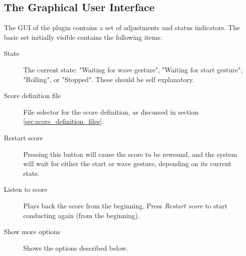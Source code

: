 \documentclass[12pt,a4paper]{article}
\begin{document}
\subsection{The Graphical User Interface}

The GUI of the plugin contains a set of adjustments and status indicators.
The basic set initially visible contains the following items:
\begin{description}
\item[State] The current state: "Waiting for wave gesture", "Waiting for start gesture", "Rolling", or "Stopped". These should be self explanatory.
\item[Score definition file] File selector for the score definition, as discussed in section \ref{sec:score_definition_files}.
\item[Restart score] Pressing this button will cause the score to be rewound, and the system will wait for either the start or wave gesture,
depending on its current state.
\item[Listen to score] Plays back the score from the beginning. Press \textit{Restart score} to start conducting again (from the beginning).
\item[Show more options] Shows the options described below.
\end{description}
\end{document}
